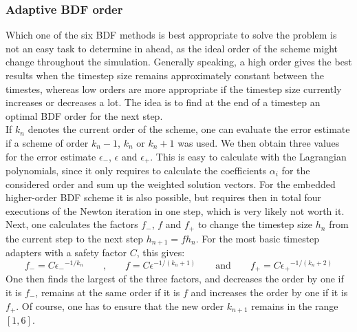 \subsubsection{Adaptive BDF order}
\label{sssec:adaptiveBDFOrder}
Which one of the six BDF methods is best appropriate to solve the problem is not an easy task to determine in ahead, as the ideal order of the scheme might change throughout the simulation. Generally speaking, a high order gives the best results when the timestep size remains approximately constant between the timestes, whereas low orders are more appropriate if the timestep size currently increases or decreases a lot. The idea is to find at the end of a timestep an optimal BDF order for the next step. \\
If $k_n$ denotes the current order of the scheme, one can evaluate the error estimate if a scheme of order $k_n-1$, $k_n$ or $k_n+1$ was used. We then obtain three values for the error estimate $\epsilon_-$, $\epsilon$ and $\epsilon_+$. This is easy to calculate with the Lagrangian polynomials, since it only requires to calculate the coefficients $\alpha_i$ for the considered order and sum up the weighted solution vectors. For the embedded higher-order BDF scheme it is also possible, but requires then in total four executions of the Newton iteration in one step, which is very likely not worth it. \\
Next, one calculates the factors $f_-$, $f$ and $f_+$ to change the timestep size $h_n$ from the current step to the next step $h_{n+1} = fh_n$. For the most basic timestep adapters with a safety factor $C$, this gives: 
\begin{equation}
	f_- = C{\epsilon_-}^{-1/k_n} \qquad \text{,}\qquad 
	f   = C{\epsilon}^{-1/(k_n+1)} \qquad \text{and}\qquad 
	f_+ = C{\epsilon_+}^{-1/(k_n+2)}
\end{equation}
One then finds the largest of the three factors, and decreases the order by one if it is $f_-$, remains at the same order if it is $f$ and increases the order by one if it is $f_+$. Of course, one has to ensure that the new order $k_{n+1}$ remains in the range $[1,6]$. 


